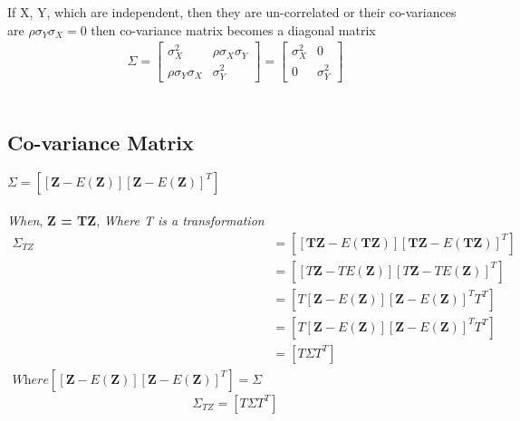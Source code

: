 \documentclass{article}
\begin{document}
If X, Y, which  are independent, then they are un-correlated or their co-variances are $\rho \sigma_{Y} \sigma_{X} = 0$ then co-variance matrix becomes a diagonal matrix\\
\begin{align*}
    \Sigma = \begin{bmatrix}
         \sigma_{X}^2                  &     \rho \sigma_{X} \sigma_{Y}\\
         \rho \sigma_{Y} \sigma_{X}     &      \sigma_{Y}^2
        \end{bmatrix} 
        = \begin{bmatrix}
         \sigma_{X}^2      & 0\\
          0  & \sigma_{Y}^2
        \end{bmatrix}
\end{align*}\\
\subsection{Co-variance Matrix}
    $\Sigma = [[\mathbf{Z} - E(\mathbf{Z})][\mathbf{Z} - E(\mathbf{Z})]^T]$\\
    \\\textit{When}, \hspace{5pt} \textbf{Z = TZ}, \hspace{5pt} \textit{Where T is a transformation}\\
\begin{align*}
    \Sigma_{TZ} &= [[\mathbf{TZ} - E(\mathbf{TZ})][\mathbf{TZ} - E(\mathbf{TZ})]^T]\\
    &= [[T\mathbf{Z} - T E(\mathbf{Z})][T\mathbf{Z} - TE(\mathbf{Z})]^T]\\
    &= [T[\mathbf{Z} - E(\mathbf{Z})][\mathbf{Z} - E(\mathbf{Z})]^T T^T]\\
    &= [T[\mathbf{Z} - E(\mathbf{Z})][\mathbf{Z} - E(\mathbf{Z})]^T T^T]\\
    &=  [T \Sigma T^T]\\
    \textit{Where} [[\mathbf{Z} - E(\mathbf{Z})][\mathbf{Z} - E(\mathbf{Z})]^T] = \Sigma
\end{align*}
\begin{equation}
    \Sigma_{TZ} = [T \Sigma T^T]
\end{equation}
\end{document}
